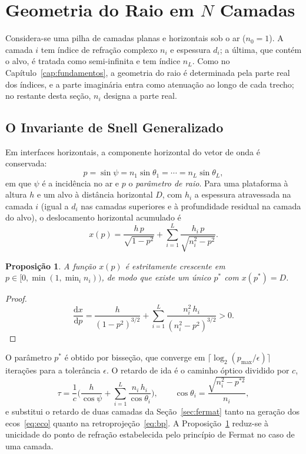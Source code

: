 \documentclass[12pt,a4paper,oneside]{book}
\theoremstyle{remark}
\newcommand{\dd}{\mathrm{d}}
\theoremstyle{plain}
\newtheorem{proposicao}{Proposição}[chapter]
\theoremstyle{definition}
\begin{document}
\section{Geometria do Raio em $N$ Camadas}
\label{sec:multi_geom}

Considera-se uma pilha de camadas planas e horizontais sob o ar ($n_0=1$). A
camada $i$ tem índice de refração complexo $n_i$ e espessura $d_i$; a última, que
contém o alvo, é tratada como semi-infinita e tem índice $n_L$. Como no
Capítulo~\ref{cap:fundamentos}, a geometria do raio é determinada pela parte real
dos índices, e a parte imaginária entra como atenuação ao longo de cada trecho;
no restante desta seção, $n_i$ designa a parte real.

\subsection{O Invariante de Snell Generalizado}
\label{sec:snell_inv}

Em interfaces horizontais, a componente horizontal do vetor de onda é conservada:
\begin{equation}
  p = \sin\psi = n_1\sin\theta_1 = \cdots = n_L\sin\theta_L ,
  \label{eq:snell_inv}
\end{equation}
em que $\psi$ é a incidência no ar e $p$ o \emph{parâmetro de raio}. Para uma
plataforma à altura $h$ e um alvo à distância horizontal $D$, com $h_i$ a
espessura atravessada na camada $i$ (igual a $d_i$ nas camadas superiores e à
profundidade residual na camada do alvo), o deslocamento horizontal acumulado é
\begin{equation}
  x(p) = \frac{h\,p}{\sqrt{1-p^2}} + \sum_{i=1}^{L} \frac{h_i\,p}{\sqrt{n_i^2-p^2}} .
  \label{eq:horiz_p}
\end{equation}

\begin{proposicao}
\label{prop:unicidade_p}
A função $x(p)$ é estritamente crescente em $p\in[0,\min(1,\min_i n_i))$, de modo
que existe um único $p^\ast$ com $x(p^\ast)=D$.
\end{proposicao}

\begin{proof}
\[
  \frac{\dd x}{\dd p} = \frac{h}{(1-p^2)^{3/2}}
  + \sum_{i=1}^{L} \frac{n_i^2\,h_i}{(n_i^2-p^2)^{3/2}} > 0 .
\]
\end{proof}

O parâmetro $p^\ast$ é obtido por bisseção, que converge em
$\lceil\log_2(p_{\max}/\epsilon)\rceil$ iterações para a tolerância $\epsilon$.
O retardo de ida é o caminho óptico dividido por $c$,
\begin{equation}
  \tau = \frac1c\Big(\frac{h}{\cos\psi}+\sum_{i=1}^{L}\frac{n_i\,h_i}{\cos\theta_i}\Big),
  \qquad \cos\theta_i=\frac{\sqrt{n_i^2-p^{\ast2}}}{n_i},
  \label{eq:tau_multi}
\end{equation}
e substitui o retardo de duas camadas da Seção~\ref{sec:fermat} tanto na geração
dos ecos~\eqref{eq:eco} quanto na retroprojeção~\eqref{eq:bp}. A
Proposição~\ref{prop:unicidade_p} reduz-se à unicidade do ponto de refração
estabelecida pelo princípio de Fermat no caso de uma camada.
\end{document}
